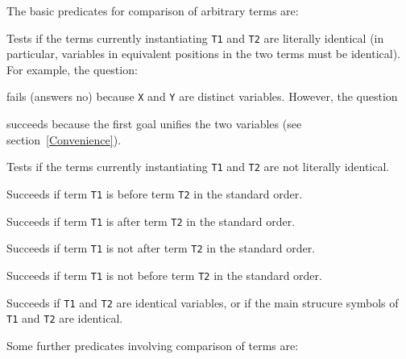 The basic predicates for comparison of arbitrary terms are:
\begin{description}
    Tests if the terms currently instantiating {\tt T1} and {\tt T2}
    are literally identical (in particular, variables in equivalent positions
    in the two terms must be identical).
    For example, the question:


    \noindent
    fails (answers no) because {\tt X} and {\tt Y} are distinct variables.
    However, the question


    \noindent
    succeeds because the first goal unifies the two variables 
    (see section~\ref{Convenience}).

    Tests if the terms currently instantiating {\tt T1} and {\tt T2}
    are not literally identical.

    Succeeds if term {\tt T1} is before term {\tt T2} in the standard order.

    Succeeds if term {\tt T1} is after term {\tt T2} in the standard order.

    Succeeds if term {\tt T1} is not after term {\tt T2} in the standard order.

    Succeeds if term {\tt T1} is not before term {\tt T2} in the standard order.

    Succeeds if {\tt T1} and {\tt T2} are identical variables, or if
    the main strucure symbols of {\tt T1} and {\tt T2} are identical.

\end{description}

Some further predicates involving comparison of terms are:

